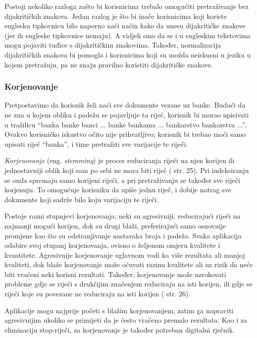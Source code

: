 \documentclass[a4paper,twoside,12pt]{scrreprt}
\begin{document}
Postoji nekoliko razloga zašto bi korisnicima trebalo omogućiti pretraživanje bez dijakritičkih znakova. Jedan razlog je što bi inače korisnicima koji koriste englesku tipkovnicu bilo naporno naći način kako da unesu dijakritičke znakove (jer ih engleske tipkovnice nemaju). A vidjeli smo da se i u engleskim tekstovima mogu pojaviti tuđice s dijakritičkim znakovima. Također, normalizacija dijakritičkih znakova bi pomogla i korisnicima koji su možda neiskusni u jeziku u kojem pretražuju, pa ne znaju pravilno koristiti dijakritičke znakove.

\subsubsection{Korjenovanje}

Pretpostavimo da korisnik želi naći sve dokumente vezane uz banke. Budući da ne zna u kojem obliku i padežu se pojavljuje ta riječ, korisnik bi morao upisivati u tražilicu ``banka banke banci ... banke bankama ... bankarstvo bankarstva ...''. Ovakvo korisničko iskustvo očito nije prihvatljivo; korisnik bi trebao moći samo upisati riječ ``banka'', i time pretražiti sve varijacije te riječi.

\textit{Korjenovanje} (eng. \textit{stemming}) je proces reduciranja riječi na njen korijen ili jednostavniji oblik koji sam po sebi ne mora biti riječ (\cite{taming} str. 25). Pri indeksiranju se onda spremaju samo korijeni riječi, a pri pretraživanju se također sve riječi korjenuju. To omogućuje korisniku da upiše jednu riječ, i dobije natrag sve dokumente koji sadrže bilo koju varijaciju te riječi.

Postoje razni stupnjevi korjenovanja; neki su agresivniji, reducirajući riječi na najmanji mogući korijen, dok su drugi blaži, preferirajući samo osnovnije promjene kao što su odstranjivanje nastavaka broja i padeža. Svaka aplikacija odabire svoj stupanj korjenovanja, ovisno o željenom omjeru kvalitete i kvantitete. Agresivnije korjenovanje uglavnom vodi ka više rezultata ali manjoj kvaliteti, dok blaže korjenovanje može očuvati razinu kvalitete ali uz rizik da neće biti vraćeni neki korisni rezultati. Također, korjenovanje može uzrokovati probleme gdje se riječi s drukčijim značenjem reduciraju na isti korijen, ili gdje se riječi koje su povezane ne reduciraju na isti korijen (\cite{taming} str. 26).

Aplikacije mogu najprije početi s blažim korjenovanjem, zatim ga napraviti agresivnijim ukoliko se primijeti da je često vraćeno premalo rezultata. Kao i za eliminaciju stop-riječi, za korjenovanje je također potreban digitalni rječnik.
\end{document}

